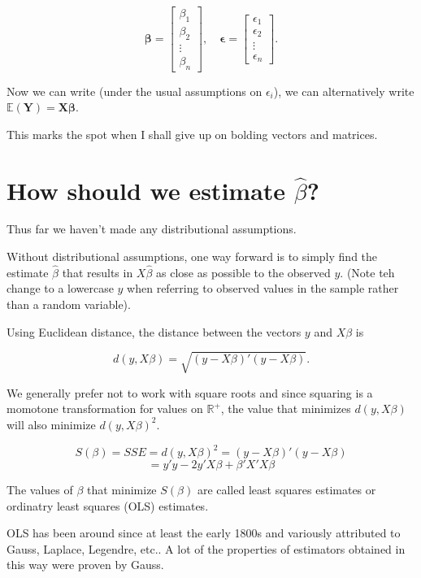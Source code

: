 \documentclass[
  letterpaper,
  DIV=11,
  numbers=noendperiod]{scrreport}
\begin{document}
\[ \pmb \beta = \left[ \begin{array}{c} \beta_1 \\ \beta_2 \\ \vdots \\ \beta_n \end{array}  \right],
\quad \pmb \epsilon = \left[ \begin{array}{c} \epsilon_1 \\ \epsilon_2 \\ \vdots \\ \epsilon_n \end{array}  \right].\]

Now we can write (under the usual assumptions on \(\epsilon_i\)), we can
alternatively write \(\mathbb E(\pmb Y) = \pmb X \pmb \beta\).

This marks the spot when I shall give up on bolding vectors and
matrices.

\hypertarget{how-should-we-estimate-hat-beta}{%
\section{\texorpdfstring{How should we estimate
\(\hat \beta\)?}{How should we estimate \textbackslash hat \textbackslash beta?}}\label{how-should-we-estimate-hat-beta}}

Thus far we haven't made any distributional assumptions.

Without distributional assumptions, one way forward is to simply find
the estimate \(\hat \beta\) that results in \(X \hat \beta\) as close as
possible to the observed \(y\). (Note teh change to a lowercase \(y\)
when referring to observed values in the sample rather than a random
variable).

Using Euclidean distance, the distance between the vectors \(y\) and
\(X \beta\) is

\[ d(y, X\beta) = \sqrt{(y-X\beta)'(y-X\beta)}.\]

We generally prefer not to work with square roots and since squaring is
a momotone transformation for values on \(\mathbb R^+\), the value that
minimizes \(d(y, X\beta)\) will also minimize \(d(y,X\beta)^2\).

\[S(\beta) = SSE = d(y,X\beta)^2 = (y-X\beta)'(y-X\beta)\]
\[ = y'y - 2y'X\beta + \beta' X' X \beta\]

The values of \(\beta\) that minimize \(S(\beta)\) are called least
squares estimates or ordinatry least squares (OLS) estimates.

OLS has been around since at least the early 1800s and variously
attributed to Gauss, Laplace, Legendre, etc.. A lot of the properties of
estimators obtained in this way were proven by Gauss.
\end{document}
